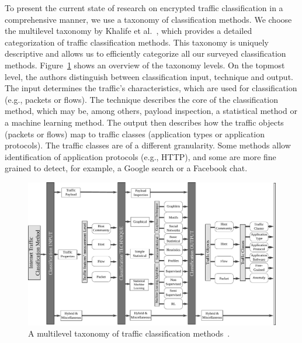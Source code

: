 To present the current state of research on encrypted traffic classification in a comprehensive manner, we use a taxonomy of classification methods. We choose the multilevel taxonomy by Khalife et al.~\cite{Khalife-2014-multilevel}, which provides a detailed categorization of traffic classification methods. This taxonomy is uniquely descriptive and allows us to efficiently categorize all our surveyed classification methods. Figure~\ref{fig:taxonomy} shows an overview of the taxonomy levels. On the topmost level, the authors distinguish between classification input, technique and output. The input determines the traffic's characteristics, which are used for classification (e.g., packets or flows). The technique describes the core of the classification method, which may be, among others, payload inspection, a statistical method or a machine learning method. The output then describes how the traffic objects (packets or flows) map to traffic classes (application types or application protocols). The traffic classes are of a different granularity. Some methods allow identification of application protocols (e.g., HTTP), and some are more fine grained to detect, for example, a Google search or a Facebook chat.

\begin{figure}[!ht]
	\begin{center}
		\includegraphics[width=\textwidth]{figures/taxonomy}
		\caption{A multilevel taxonomy of traffic classification methods~\cite{Khalife-2014-multilevel}.} \label{fig:taxonomy}
	\end{center}
\end{figure}

